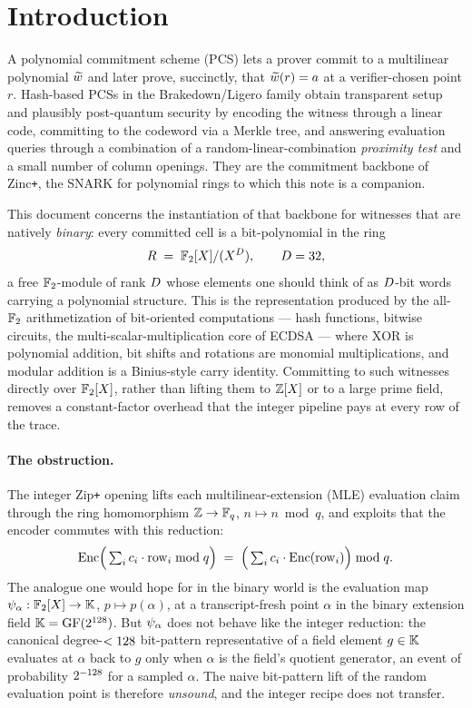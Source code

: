 \section{Introduction}
\label{sec:intro}

A polynomial commitment scheme (PCS) lets a prover commit to a
multilinear polynomial $\widetilde{w}$ and later prove, succinctly, that
$\widetilde{w}(r) = a$ at a verifier-chosen point $r$. Hash-based PCSs in the
Brakedown/Ligero family obtain transparent setup and plausibly
post-quantum security by encoding the witness through a linear code,
committing to the codeword via a Merkle tree, and answering evaluation
queries through a combination of a random-linear-combination
\emph{proximity test} and a small number of column openings. They are
the commitment backbone of Zinc\texttt{+}, the SNARK for polynomial
rings to which this note is a companion.

This document concerns the instantiation of that backbone for witnesses
that are natively \emph{binary}: every committed cell is a
bit-polynomial in the ring
\[
  R \;=\; \mathbb{F}_2[X]/(X^{D}),
  \qquad D = 32,
\]
a free $\mathbb{F}_2$-module of rank $D$ whose elements one should think of
as $D$-bit words carrying a polynomial structure. This is the
representation produced by the all-$\mathbb{F}_2$ arithmetization of
bit-oriented computations --- hash functions, bitwise circuits, the
multi-scalar-multiplication core of ECDSA --- where $\mathrm{XOR}$ is
polynomial addition, bit shifts and rotations are monomial
multiplications, and modular addition is a Binius-style carry identity.
Committing to such witnesses directly over $\mathbb{F}_2[X]$, rather than
lifting them to $\mathbb{Z}[X]$ or to a large prime field, removes a
constant-factor overhead that the integer pipeline pays at every row of
the trace.

\paragraph{The obstruction.} The integer Zip\texttt{+} opening lifts
each multilinear-extension (MLE) evaluation claim through the ring
homomorphism $\mathbb{Z} \to \mathbb{F}_q$, $n \mapsto n \bmod q$, and exploits that the
encoder commutes with this reduction:
\[
  \operatorname{Enc}\!\Big(\textstyle\sum_i c_i \cdot \mathrm{row}_i \bmod q\Big)
  \;=\;
  \Big(\textstyle\sum_i c_i \cdot \operatorname{Enc}(\mathrm{row}_i)\Big) \bmod q .
\]
The analogue one would hope for in the binary world is the evaluation
map $\psi_{\alpha} : \mathbb{F}_2[X] \to \mathbb{K}$, $p \mapsto p(\alpha)$, at a
transcript-fresh point $\alpha$ in the binary extension field
$\mathbb{K} = \mathrm{GF}(2^{128})$. But $\psi_{\alpha}$ does not behave like the
integer reduction: the canonical degree-$<128$ bit-pattern
representative of a field element $g \in \mathbb{K}$ evaluates at $\alpha$ back
to $g$ only when $\alpha$ is the field's quotient generator, an event of
probability $2^{-128}$ for a sampled $\alpha$. The naive bit-pattern
lift of the random evaluation point is therefore \emph{unsound}, and the
integer recipe does not transfer.

